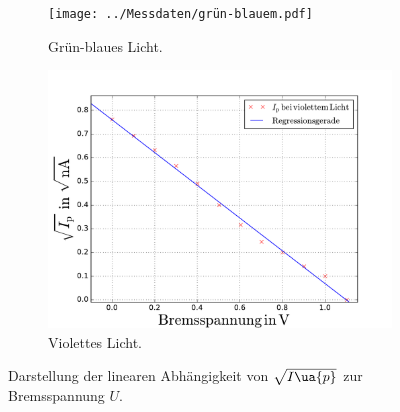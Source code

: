 \begin{figure}
  \centering
  \begin{subfigure}{0.48\textwidth}
    \centering
    \texttt{[image: ../Messdaten/grün-blauem.pdf]}
    \caption{Grün-blaues Licht.}
    \label{fig: grün-blau}
  \end{subfigure}
  \begin{subfigure}{0.48\textwidth}
    \centering
    \includegraphics[width=1 \textwidth]{../Messdaten/violettem.pdf} %
    \caption{Violettes Licht.}
    \label{fig: violett}
  \end{subfigure}
  \caption{Darstellung der linearen Abhängigkeit von $\sqrt{I\ua{p}}$ zur Bremsspannung $U$.}
  \label{fig: darstellung_2}
\end{figure}
